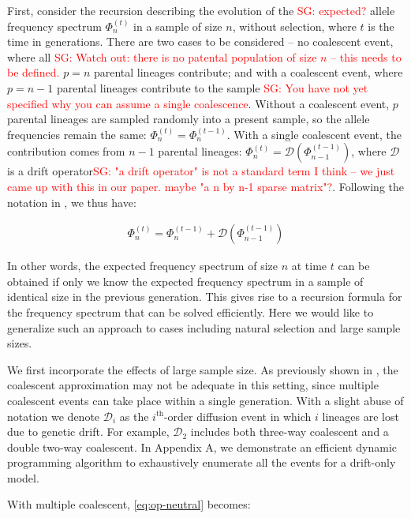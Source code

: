 \documentclass[review]{elsarticle}
\newcommand{\sgcomment}[1]{\textcolor{red}{SG: #1}}
\begin{document}
First, consider the recursion describing the evolution of the \sgcomment{expected?} allele frequency spectrum
$\Phi_{n}^{(t)}$ in a sample of size $n$, without selection, where $t$ is the time in generations. There are two cases to be considered --
no coalescent event, where all \sgcomment{Watch out: there is no patental population of size $n$ -- this needs to be defined.} $p=n$ parental lineages contribute; and with a coalescent event,
where $p=n-1$ parental lineages contribute to the sample \sgcomment{You have not yet specified why you can assume a single coalescence}. Without a coalescent event, $p$ parental
lineages are sampled randomly into a present sample, so the allele frequencies remain the same:
$\Phi_{n}^{(t)}=\Phi_{n}^{(t-1)}$. With a single coalescent event, the contribution comes from $n-1$
parental lineages: $\Phi_{n}^{(t)}=\mathcal{D}(\Phi_{n-1}^{(t-1)})$, where $\mathcal{D}$ is a drift
operator\sgcomment{"a drift operator" is not a standard term I think -- we just came up with this in our paper. maybe "a n by n-1 sparse matrix"?}. Following the notation in \cite{JouganousEtAl2017}, we thus have:

\begin{align}
  \label{eq:op-neutral}
  \Phi_{n}^{(t)}=\Phi_{n}^{(t-1)}+\mathcal{D}(\Phi_{n-1}^{(t-1)})
\end{align}

In other words, the expected frequency spectrum of size $n$ at time $t$ can be obtained if only we know the expected frequency spectrum in a sample of identical size in the previous generation. This gives rise to a recursion formula for the frequency spectrum that can be solved efficiently\cite{JouganousEtAl2017}. Here we would like to generalize such an approach to cases including natural selection and large sample sizes.  


We first incorporate the effects of large sample size. As previously shown in
\cite{BhaskarEtAl2014,NelsonEtAl2019}, the coalescent approximation may not be adequate in this
setting, since multiple coalescent events can take place within a single generation. With a slight
abuse of notation we denote $\mathcal{D}_i$ as the $i^{\text{th}}$-order diffusion event in which $i$ lineages are lost due to genetic drift. For example, $\mathcal{D}_2$  includes both three-way coalescent and a double two-way coalescent. In
Appendix A, we demonstrate an efficient dynamic programming algorithm to exhaustively enumerate all
the events for a drift-only model.

With multiple coalescent, \eqref{eq:op-neutral} becomes:
\end{document}
